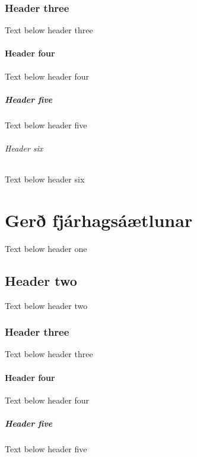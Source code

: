 \documentclass[a4paper,10pt,icelandic]{sphinxmanual}
\begin{document}
\subsection{Header three}
\label{\detokenize{tekjur-og-utgjold/index:header-three}}
\sphinxAtStartPar
Text below header three


\subsubsection{Header four}
\label{\detokenize{tekjur-og-utgjold/index:header-four}}
\sphinxAtStartPar
Text below header four


\paragraph{Header five}
\label{\detokenize{tekjur-og-utgjold/index:header-five}}
\sphinxAtStartPar
Text below header five


\subparagraph{Header six}
\label{\detokenize{tekjur-og-utgjold/index:header-six}}
\sphinxAtStartPar
Text below header six

\sphinxstepscope


\chapter{Gerð fjárhagsáætlunar}
\label{\detokenize{gerd-fjarhagsaaetlunar/index:ger-fjarhagsaaetlunar}}\label{\detokenize{gerd-fjarhagsaaetlunar/index::doc}}
\sphinxAtStartPar
Text below header one


\section{Header two}
\label{\detokenize{gerd-fjarhagsaaetlunar/index:header-two}}
\sphinxAtStartPar
Text below header two


\subsection{Header three}
\label{\detokenize{gerd-fjarhagsaaetlunar/index:header-three}}
\sphinxAtStartPar
Text below header three


\subsubsection{Header four}
\label{\detokenize{gerd-fjarhagsaaetlunar/index:header-four}}
\sphinxAtStartPar
Text below header four


\paragraph{Header five}
\label{\detokenize{gerd-fjarhagsaaetlunar/index:header-five}}
\sphinxAtStartPar
Text below header five
\end{document}
